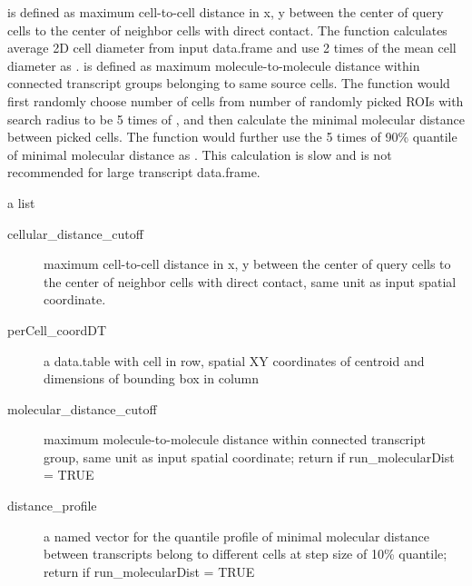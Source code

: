 \documentclass[letterpaper]{book}
\begin{document}
\begin{Details}
 is defined as maximum cell-to-cell distance in x, y between the center of query cells to the center of neighbor cells with direct contact. The function calculates average 2D cell diameter from input data.frame and use 2 times of the mean cell diameter as .  is defined as maximum molecule-to-molecule distance within connected transcript groups belonging to same source cells. The function would first randomly choose  number of cells from  number of randomly picked ROIs with search radius to be 5 times of , and then calculate the minimal molecular distance between picked cells. The function would further use the 5 times of 90\% quantile of minimal molecular distance as . This calculation is slow and is not recommended for large transcript data.frame.
\end{Details}
%
\begin{Value}
a list
\begin{description}

\item[cellular\_distance\_cutoff] maximum cell-to-cell distance in x, y between the center of query cells to the center of neighbor cells with direct contact, same unit as input spatial coordinate. 
\item[perCell\_coordDT] a data.table with cell in row, spatial XY coordinates of centroid and dimensions of bounding box in column
\item[molecular\_distance\_cutoff] maximum molecule-to-molecule distance within connected transcript group, same unit as input spatial coordinate; return if run\_molecularDist = TRUE
\item[distance\_profile] a named vector for the quantile profile of minimal molecular distance between transcripts belong to different cells at step size of 10\% quantile; return if run\_molecularDist = TRUE

\end{description}

\end{Value}
%
\begin{Examples}
\end{Examples}
\end{document}
